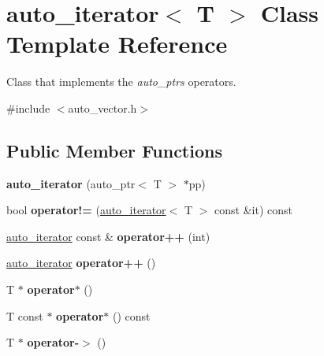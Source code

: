\hypertarget{classauto__iterator}{\section{auto\-\_\-iterator$<$ T $>$ Class Template Reference}
\label{classauto__iterator}
}


Class that implements the {\itshape auto\-\_\-ptrs} operators.  




{\ttfamily \#include $<$auto\-\_\-vector.\-h$>$}

\subsection*{Public Member Functions}
\begin{DoxyCompactItemize}
\item 
\hypertarget{classauto__iterator_aebfd2b8221b5003ff09946b6e7058481}{{\bfseries auto\-\_\-iterator} (auto\-\_\-ptr$<$ T $>$ $\ast$pp)}\label{classauto__iterator_aebfd2b8221b5003ff09946b6e7058481}

\item 
\hypertarget{classauto__iterator_acaf821dd51def74ccfea7df4303a5844}{bool {\bfseries operator!=} (\hyperlink{classauto__iterator}{auto\-\_\-iterator}$<$ T $>$ const \&it) const }\label{classauto__iterator_acaf821dd51def74ccfea7df4303a5844}

\item 
\hypertarget{classauto__iterator_a25da7c273f44b6874b0aa688b51a0324}{\hyperlink{classauto__iterator}{auto\-\_\-iterator} const \& {\bfseries operator++} (int)}\label{classauto__iterator_a25da7c273f44b6874b0aa688b51a0324}

\item 
\hypertarget{classauto__iterator_aaead03d74bac44a44742bd6dd80a39a8}{\hyperlink{classauto__iterator}{auto\-\_\-iterator} {\bfseries operator++} ()}\label{classauto__iterator_aaead03d74bac44a44742bd6dd80a39a8}

\item 
\hypertarget{classauto__iterator_a4d3bbf29747a8e078ccbb348e1ca5405}{T $\ast$ {\bfseries operator$\ast$} ()}\label{classauto__iterator_a4d3bbf29747a8e078ccbb348e1ca5405}

\item 
\hypertarget{classauto__iterator_a0009eb5d3cee4489204e8f0cde9f9157}{T const $\ast$ {\bfseries operator$\ast$} () const }\label{classauto__iterator_a0009eb5d3cee4489204e8f0cde9f9157}

\item 
\hypertarget{classauto__iterator_ae97c529538345fea66485049e7e4667f}{T $\ast$ {\bfseries operator-\/$>$} ()}\label{classauto__iterator_ae97c529538345fea66485049e7e4667f}

\end{DoxyCompactItemize}


